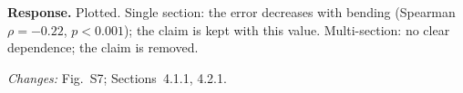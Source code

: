 \textbf{Response.} Plotted. Single section: the error decreases with bending (Spearman $\rho = -0.22$, $p < 0.001$); the claim is kept with this value. Multi-section: no clear dependence; the claim is removed.

\textit{Changes:} Fig.~S7; Sections~4.1.1, 4.2.1.
